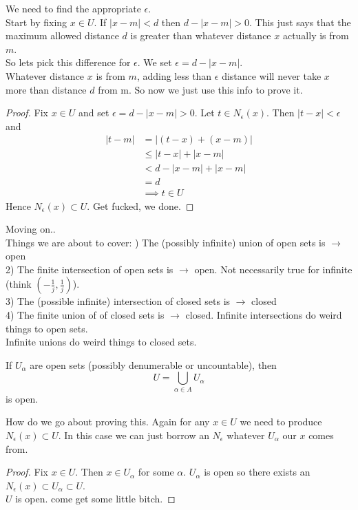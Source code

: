 \documentclass{article}
\begin{document}
We need to find the appropriate \( \epsilon \). \\
Start by fixing \( x \in U \). If \( |x - m| < d \) then 
\( d - |x - m| > 0 \). This just says that the maximum allowed distance \( d \) 
is greater than whatever distance  \( x \) actually is from \( m \). \\
So lets pick this difference for \( \epsilon \). We set \( \epsilon = d - |x - m| \).  \\
Whatever distance \( x \) is from  \( m \), adding less than \( \epsilon \)
distance will never take  \( x \) more than distance \( d \) from m.
So now we just use this info to prove it.

\begin{proof}
    Fix \( x \in U \) and set \( \epsilon = d - |x-m| > 0\).
    Let \( t \in N_\epsilon(x) \). Then \(|t-x| < \epsilon\) and 
    \begin{align*}
        |t-m| &= |(t-x)+ (x-m)| \\
              &\le |t-x| + |x-m|  \\
              &< d - |x-m| + |x-m| \\
              &= d \\
              &\implies t \in U
    \end{align*} 
    Hence \( N_\epsilon(x) \subset U \).  Get fucked, we done.
\end{proof}
Moving on.. \\
Things we are about to cover: 
) The (possibly infinite) union of open sets is \( \rightarrow \) open \\
2) The finite intersection of open sets is \( \rightarrow \) open. Not necessarily true for infinite (think \( (-\frac{1}{j}, \frac{1}{j}) \)). \\
3) The (possible infinite) intersection of closed sets is \( \rightarrow \) closed \\
4) The finite union of of closed sets is \( \rightarrow \) closed.
\medbreak
Infinite intersections do weird things to open sets. \\
Infinite unions do weird things to closed sets.

\pagebreak
\begin{theorem}
    If \( U_\alpha \) are open sets (possibly denumerable or uncountable), then
    \[
        U = \bigcup_{\alpha \in A} U_\alpha
    \] 
    is open.
\end{theorem}
How do we go about proving this. Again for any \( x \in U \) we need to produce
\( N_\epsilon(x) \subset U \). In this case we can just borrow an \( N_\epsilon \) 
whatever  \( U_\alpha \)  our \( x \) comes from.
\begin{proof}
    Fix \( x \in U \). Then \( x \in U_\alpha \) for some \( \alpha \).
    \( U_\alpha \) is open so there exists an \( N_\epsilon(x) \subset U_\alpha \subset U \).\\
    \( U \) is open. come get some little bitch.
\end{proof}
\end{document}
